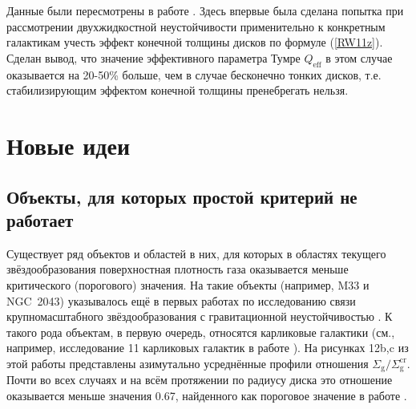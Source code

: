 \documentclass[russian,12pt]{article}
\begin{document}
Данные \cite{Leroy+08} были пересмотрены в работе \cite{RW11}. Здесь 
впервые была сделана попытка при рассмотрении двухжидкостной 
неустойчивости применительно к конкретным галактикам учесть эффект конечной 
толщины дисков по формуле (\ref{RW11z}). Сделан вывод, что значение 
эффективного параметра Тумре $Q_\mathrm{eff}$ в этом случае оказывается 
на 20-50\% больше, чем в случае бесконечно тонких дисков, т.е. 
стабилизирующим эффектом конечной толщины пренебрегать нельзя.

\section{Новые идеи}

\subsection{Объекты, для которых простой критерий не работает}

Существует ряд объектов и областей в них, для которых в областях 
текущего звёздообразования поверхностная плотность газа оказывается 
меньше критического (порогового) значения. На такие объекты (например, 
M33 и NGC~2043) указывалось ещё в первых работах по исследованию связи 
крупномасштабного звёздообразования с гравитационной неустойчивостью 
\citep{Kennicutt89,MK01}. К такого рода объектам, в первую очередь, 
относятся карликовые галактики (см., например, исследование 11 карликовых 
галактик в работе \citealp{vanZee+97}). На рисунках 12b,c из этой работы 
представлены азимутально усреднённые профили отношения 
$\Sigma_\mathrm{g} / \Sigma_\mathrm{g}^\mathrm{cr}$. Почти во всех 
случаях и на всём протяжении по радиусу диска это отношение оказывается 
меньше значения 0.67, найденного как пороговое значение в работе 
\cite{Kennicutt89}.
\end{document}
